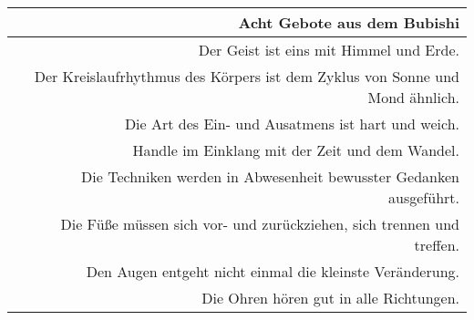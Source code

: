 \begin{tcolorbox}[colframe=lightgray,colback=white,coltitle=black,title=Allgemeines:\indent Grundsätze und D\={o}j\={o}kun nach Miyagi Chojun]
\begin{footnotesize}
		\begin{tabularx}{\textwidth}{Xr}	
			\hfill & \textbf{Acht Gebote aus dem Bubishi}\\
			\midrule
			\hfill & Der Geist ist eins mit Himmel und Erde. \\
			\hfill & Der Kreislaufrhythmus des Körpers ist dem Zyklus von Sonne und Mond ähnlich. \\
			\hfill & Die Art des Ein- und Ausatmens ist hart und weich. \\
			\hfill & Handle im Einklang mit der Zeit und dem Wandel. \\
			\hfill & Die Techniken werden in Abwesenheit bewusster Gedanken ausgeführt. \\
			\hfill & Die Füße müssen sich vor- und zurückziehen, sich trennen und treffen. \\
			\hfill & Den Augen entgeht nicht einmal die kleinste Veränderung. \\
			\hfill & Die Ohren hören gut in alle Richtungen. \\
		\end{tabularx}
	\end{footnotesize}
\end{tcolorbox}
\clearpage
\pagebreak
\setcounter{num}{0}
\setcounter{numz}{0}	
